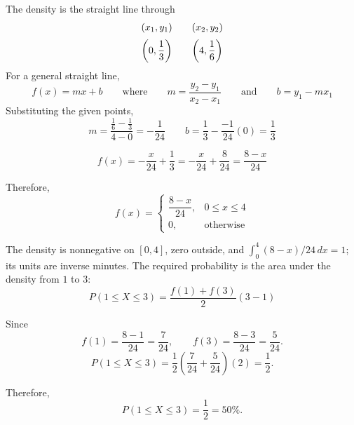 {		
		The density is the straight line through
		\[
		\begin{array}{c@{\qquad}c}
			(x_1,y_1) & (x_2,y_2) \\[2mm]
			\left(0,\dfrac13\right)
			&
			\left(4,\dfrac16\right)
		\end{array}
		\]
		For a general straight line,
		\[
		f(x)=mx+b
		\qquad
		\text{where}
		\qquad
		m=\frac{y_2-y_1}{x_2-x_1}
		\qquad\text{and}\qquad
		b=y_1-mx_1
		\]
		Substituting the given points,
		\[
		m=
		\frac{\frac16-\frac13}{4-0}
		=
		-\frac1{24}
		\qquad
		b=\frac13 - \frac{-1}{24}(0) =\frac13
		\]
		
		\[
			f(x)
			=-\frac{x}{24}+\frac13 = -\frac{x}{24}+\frac{8}{24} =\frac{8-x}{24}
		\]
		
		Therefore,
		\[
		f(x)=
		\begin{cases}
			\dfrac{8-x}{24},&0\le x\le4\\[1mm]
			0,&\text{otherwise}
		\end{cases}
		\]
		
		The density is nonnegative on \([0,4]\), zero outside, and
        \(\int_0^4(8-x)/24\,dx=1\); its units are inverse minutes.
		The required probability is the area under the density from \(1\) to \(3\):
		\[
		P(1\le X\le3)
		=
		\frac{f(1)+f(3)}{2}(3-1)
		\]
		
		Since
		\[
		f(1)=\frac{8-1}{24}=\frac{7}{24},
		\qquad
		f(3)=\frac{8-3}{24}=\frac{5}{24}.
		\]
		\[
		P(1\le X\le3)
		=
		\frac12
		\left(
		\frac{7}{24}+\frac{5}{24}
		\right)(2)
		=
		\frac12.
		\]
		
		Therefore,
		\[
		\boxed{P(1\le X\le3)=\frac12=50\%}.
		\]
		
		
		\vspace{-5mm}
		
	}
	
